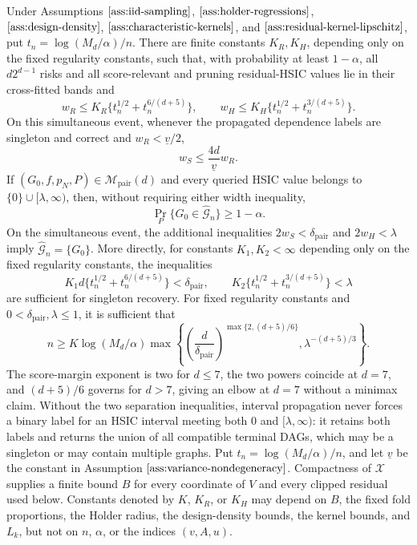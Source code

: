 Under Assumptions \(\ref{ass:iid-sampling}\), \(\ref{ass:holder-regressions}\), \(\ref{ass:design-density}\), \(\ref{ass:characteristic-kernels}\), and \(\ref{ass:residual-kernel-lipschitz}\), put \(t_n=\log(M_d/\alpha)/n\). There are finite constants \(K_R,K_H\), depending only on the fixed regularity constants, such that, with probability at least \(1-\alpha\), all \(d2^{d-1}\) risks and all score-relevant and pruning residual-HSIC values lie in their cross-fitted bands and
\[
w_R\le K_R\{t_n^{1/2}+t_n^{6/(d+5)}\},
\qquad
w_H\le K_H\{t_n^{1/2}+t_n^{3/(d+5)}\}.
\]
On this simultaneous event, whenever the propagated dependence labels are singleton and correct and \(w_R<\underline v/2\),
\[
w_S\le \frac{4d}{\underline v}w_R.
\]
If \((G_0,f,p_N,P)\in\mathcal M_{\mathrm{pair}}(d)\) and every queried HSIC value belongs to \(\{0\}\cup[\lambda,\infty)\), then, without requiring either width inequality,
\[
\Pr_P\{G_0\in\widehat{\mathcal G}_n\}\ge 1-\alpha.
\]
On the simultaneous event, the additional inequalities \(2w_S<\delta_{\mathrm{pair}}\) and \(2w_H<\lambda\) imply \(\widehat{\mathcal G}_n=\{G_0\}\). More directly, for constants \(K_1,K_2<\infty\) depending only on the fixed regularity constants, the inequalities
\[
K_1d\{t_n^{1/2}+t_n^{6/(d+5)}\}<\delta_{\mathrm{pair}},
\qquad
K_2\{t_n^{1/2}+t_n^{3/(d+5)}\}<\lambda
\]
are sufficient for singleton recovery. For fixed regularity constants and \(0<\delta_{\mathrm{pair}},\lambda\le1\), it is sufficient that
\[
n\ge K\log(M_d/\alpha)
\max\left\{
\left(\frac d{\delta_{\mathrm{pair}}}\right)^{\max\{2,(d+5)/6\}},
\lambda^{-(d+5)/3}
\right\}.
\]
The score-margin exponent is two for \(d\le7\), the two powers coincide at \(d=7\), and \((d+5)/6\) governs for \(d>7\), giving an elbow at \(d=7\) without a minimax claim. Without the two separation inequalities, interval propagation never forces a binary label for an HSIC interval meeting both \(0\) and \([\lambda,\infty)\): it retains both labels and returns the union of all compatible terminal DAGs, which may be a singleton or may contain multiple graphs.
Put \(t_n=\log(M_d/\alpha)/n\), and let \(\underline v\) be the constant in Assumption \(\ref{ass:variance-nondegeneracy}\). Compactness of \(\mathcal X\) supplies a finite bound \(B\) for every coordinate of \(V\) and every clipped residual used below. Constants denoted by \(K\), \(K_R\), or \(K_H\) may depend on \(B\), the fixed fold proportions, the Holder radius, the design-density bounds, the kernel bounds, and \(L_k\), but not on \(n\), \(\alpha\), or the indices \((v,A,u)\).

